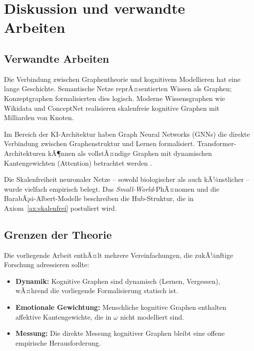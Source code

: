 ﻿\documentclass[12pt,a4paper]{article}
\theoremstyle{plain}
\theoremstyle{definition}
\theoremstyle{remark}
\begin{document}
\section{Diskussion und verwandte Arbeiten}
\label{sec:diskussion}

\subsection{Verwandte Arbeiten}

Die Verbindung zwischen Graphentheorie und kognitivem Modellieren hat eine lange Geschichte. Semantische Netze \cite{Quillian1968} reprÃ¤sentierten Wissen als Graphen; Konzeptgraphen \cite{Sowa1984} formalisierten dies logisch. Moderne Wissensgraphen wie Wikidata und ConceptNet realisieren skalenfreie kognitive Graphen mit Milliarden von Knoten.

Im Bereich der KI-Architektur haben Graph Neural Networks (GNNs) die direkte Verbindung zwischen Graphenstruktur und Lernen formalisiert. Transformer-Architekturen kÃ¶nnen als vollstÃ¤ndige Graphen mit dynamischen Kantengewichten (Attention) betrachtet werden \cite{Vaswani2017}.

Die Skalenfreiheit neuronaler Netze -- sowohl biologischer als auch kÃ¼nstlicher -- wurde vielfach empirisch belegt. Das \emph{Small-World}-PhÃ¤nomen und die BarabÃ¡si-Albert-Modelle \cite{Barabasi1999} beschreiben die Hub-Struktur, die in Axiom~\ref{ax:skalenfrei} postuliert wird.

\subsection{Grenzen der Theorie}

Die vorliegende Arbeit enthÃ¤lt mehrere Vereinfachungen, die zukÃ¼nftige Forschung adressieren sollte:

\begin{itemize}
  \item \textbf{Dynamik:} Kognitive Graphen sind dynamisch (Lernen, Vergessen), wÃ¤hrend die vorliegende Formalisierung statisch ist.
  \item \textbf{Emotionale Gewichtung:} Menschliche kognitive Graphen enthalten affektive Kantengewichte, die in $\omega$ nicht modelliert sind.
  \item \textbf{Messung:} Die direkte Messung kognitiver Graphen bleibt eine offene empirische Herausforderung.
\end{itemize}
\end{document}
